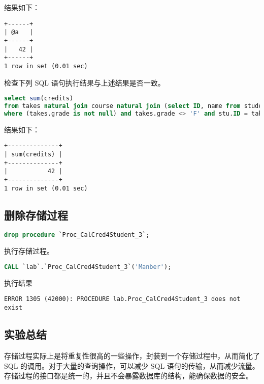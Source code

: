 \documentclass{article}
\begin{document}
结果如下：

\begin{lstlisting}
+------+
| @a   |
+------+
|   42 |
+------+
1 row in set (0.01 sec)
\end{lstlisting}

检查下列 SQL 语句执行结果与上述结果是否一致。

\begin{lstlisting}[language=sql]
select sum(credits)
from takes natural join course natural join (select ID, name from student) as stu
where (takes.grade is not null) and takes.grade <> 'F' and stu.ID = takes.ID and stu.name = 'Manber';
\end{lstlisting}

结果如下：

\begin{lstlisting}
+--------------+
| sum(credits) |
+--------------+
|           42 |
+--------------+
1 row in set (0.01 sec)
\end{lstlisting}

\subsection{删除存储过程}

\begin{lstlisting}[language=sql]
drop procedure `Proc_CalCred4Student_3`;
\end{lstlisting}

执行存储过程。

\begin{lstlisting}[language=sql]
CALL `lab`.`Proc_CalCred4Student_3`('Manber');
\end{lstlisting}

执行结果

\begin{lstlisting}
ERROR 1305 (42000): PROCEDURE lab.Proc_CalCred4Student_3 does not exist
\end{lstlisting}

\subsection{实验总结}

存储过程实际上是将重复性很高的一些操作，封装到一个存储过程中，从而简化了 SQL 的调用。对于大量的查询操作，可以减少 SQL 语句的传输，从而减少流量。存储过程的接口都是统一的，并且不会暴露数据库的结构，能确保数据的安全。
\end{document}
